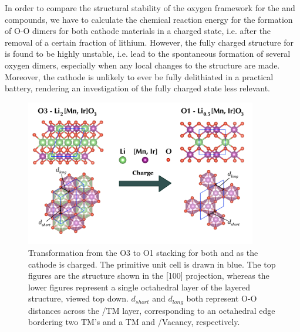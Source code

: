 \begin{refsection}

In order to compare the structural stability of the oxygen framework for the 
 and  compounds, we have to calculate the chemical 
reaction energy for the formation of O-O dimers for both cathode materials in 
a charged state, i.e. after the removal of a certain fraction of lithium. 
However, the fully charged structure for  is found to be highly 
unstable, i.e. lead to the spontaneous formation of several oxygen dimers, 
especially when any local changes to the structure are made. Moreover, the 
cathode is unlikely to ever be fully delithiated in a practical battery, 
rendering an investigation of the fully charged state less relevant. 

\begin{figure}[ht] 
\centering 
\captionsetup{width=0.9\linewidth}
\includegraphics[width=0.9\textwidth]{figures/batteries/structural_change.png} 
\caption{Transformation from the O3 to O1 stacking for both  and 
 as the cathode is charged. The primitive unit cell 
is drawn in blue. The top figures are the structure shown in the [100] 
projection, whereas the lower figures represent a single octahedral layer of 
the layered structure, viewed top down.  $d_{short}$ and $d_{long}$ both 
represent O-O distances across the /TM layer, corresponding to an 
octahedral edge bordering two \gls{TM}'s and a \gls{TM} and /Vacancy, respectively.} 
\label{batteries:fig-structural_change} 
\end{figure} 


\end{refsection}
